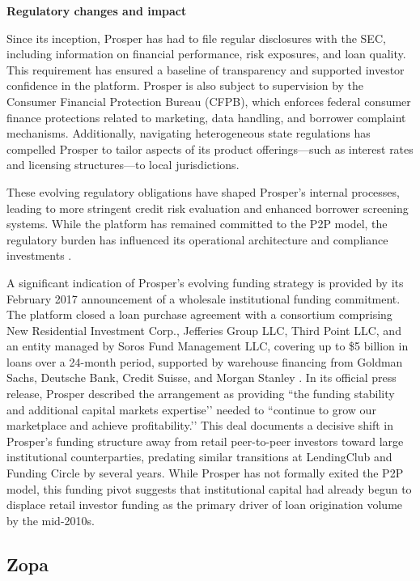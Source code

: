 \documentclass[pdflatex,sn-apa]{sn-jnl}%
\theoremstyle{thmstyleone}%
\theoremstyle{thmstyletwo}%
\theoremstyle{thmstylethree}%
\begin{document}
\textbf{Regulatory changes and impact}

Since its inception, Prosper has had to file regular disclosures with the SEC, including information on financial performance, risk exposures, and loan quality. This requirement has ensured a baseline of transparency and supported investor confidence in the platform. Prosper is also subject to supervision by the Consumer Financial Protection Bureau (CFPB), which enforces federal consumer finance protections related to marketing, data handling, and borrower complaint mechanisms. Additionally, navigating heterogeneous state regulations has compelled Prosper to tailor aspects of its product offerings—such as interest rates and licensing structures—to local jurisdictions.

These evolving regulatory obligations have shaped Prosper’s internal processes, leading to more stringent credit risk evaluation and enhanced borrower screening systems. While the platform has remained committed to the P2P model, the regulatory burden has influenced its operational architecture and compliance investments \citep{knowledge_at_wharton_peer--peer_2014}.

\textcolor{NavyBlue}{A significant indication of Prosper’s evolving funding strategy is provided by its February 2017 announcement of a wholesale institutional funding commitment. The platform closed a loan purchase agreement with a consortium comprising New Residential Investment Corp., Jefferies Group LLC, Third Point LLC, and an entity managed by Soros Fund Management LLC, covering up to \$5 billion in loans over a 24-month period, supported by warehouse financing from Goldman Sachs, Deutsche Bank, Credit Suisse, and Morgan Stanley \citep{marketplace_prosper_2017}. In its official press release, Prosper described the arrangement as providing ``the funding stability and additional capital markets expertise’’ needed to ``continue to grow our marketplace and achieve profitability.’’ This deal documents a decisive shift in Prosper’s funding structure away from retail peer-to-peer investors toward large institutional counterparties, predating similar transitions at LendingClub and Funding Circle by several years. While Prosper has not formally exited the P2P model, this funding pivot suggests that institutional capital had already begun to displace retail investor funding as the primary driver of loan origination volume by the mid-2010s.}

\subsection{Zopa}
\end{document}
